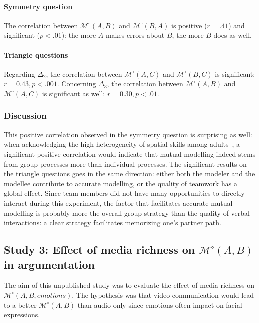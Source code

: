 \documentclass[natbib]{svjour3}
\newcommand{\Model}[3]{{$\mathcal{M}^{\circ}(#1, #2, #3)$}}
\newcommand{\gModel}[2]{{$\mathcal{M}^{\circ}(#1, #2)$}}
\begin{document}
\paragraph{Symmetry question} The correlation between \gModel{A}{B}  and
\gModel{B}{A}  is positive ($r = .41$) and significant ($p < .01$): the more $A$
makes errors about $B$, the more $B$ does as well.

\paragraph{Triangle questions} Regarding $\Delta_2$, the correlation between
\gModel{A}{C} and \gModel{B}{C} is significant: $r=0.43, p <.001$. Concerning
$\Delta_3$, the correlation between \gModel{A}{B} and \gModel{A}{C} is
significant as well: $r=0.30, p <.01$.

\subsubsection*{Discussion}

This positive correlation observed in the symmetry question is surprising as
well: when acknowledging the high heterogeneity of spatial skills among
adults~\citep{liben1981spatial}, a significant positive correlation would
indicate that mutual modelling indeed stems from group processes more than
individual processes. The significant results on the triangle questions goes in
the same direction: either both the modeler and the modellee contribute to
accurate modelling, or the quality of teamwork has a global effect. Since team
members did not have many opportunities to directly interact during this
experiment, the factor that facilitates accurate mutual modelling is probably
more the overall group strategy than the quality of verbal interactions: a clear
strategy facilitates memorizing one's partner path. 




\subsection{{\bf Study 3}:  Effect of media richness on \gModel{A}{B} in argumentation}

The aim of this unpublished study was to evaluate the effect of media richness
on \Model{A}{B}{emotions}. The hypothesis was that video communication would
lead to a better \gModel{A}{B} than audio only since emotions often impact on
facial expressions.
\end{document}
